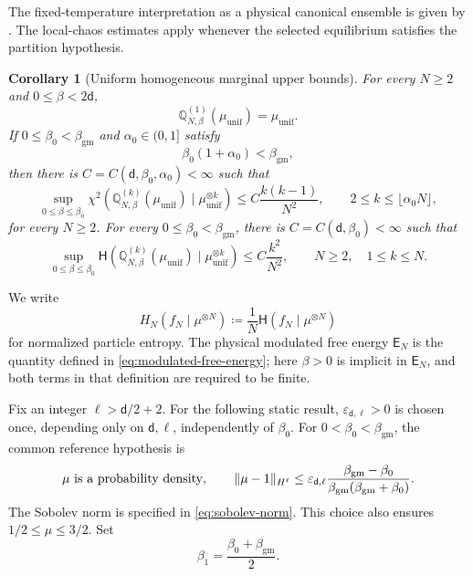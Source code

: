 \documentclass[11pt,reqno]{amsart}
\numberwithin{equation}{section}
\theoremstyle{plain}
\newtheorem{cor}[cor]{Corollary}
\theoremstyle{definition}
\DeclarePairedDelimiter{\norm}{\lVert}{\rVert}
\renewcommand{\d}{\mathsf d}
\newcommand{\Q}{\mathbb Q}
\newcommand{\be}{\beta}
\newcommand{\al}{\alpha}
\newcommand{\vep}{\varepsilon}
\newcommand{\Hr}{\mathsf H}
\newcommand{\Er}{\mathsf E}
\newcommand{\muunif}{\mu_{\mathrm{unif}}}
\newcommand{\gm}{\mathrm{gm}}
\begin{document}
The fixed-temperature interpretation as a physical canonical ensemble is given by . The local-chaos estimates apply whenever the selected equilibrium satisfies the partition hypothesis.

\begin{cor}[Uniform homogeneous marginal upper bounds]
\label{cor:homogeneous-local-chaos-upper-bounds}
For every $N\geq2$ and $0\leq\be<2\d$,
\begin{equation}
 \Q_{N,\be}^{(1)}(\muunif)=\muunif.
 \label{eq:homogeneous-exact-first-marginal}
\end{equation}
If $0\leq\be_0<\beta_{\gm}$ and $\al_0\in(0,1]$ satisfy
\begin{equation}
 \be_0(1+\al_0)<\beta_{\gm},
 \label{eq:homogeneous-local-window}
\end{equation}
then there is $C=C(\d,\be_0,\al_0)<\infty$ such that
\begin{equation}
 \sup_{0\leq\be\leq\be_0}
 \chi^2\!\left(\Q_{N,\be}^{(k)}(\muunif)\mid\muunif^{\otimes k}\right)
 \leq C\frac{k(k-1)}{N^2},
 \qquad 2\leq k\leq\lfloor\al_0N\rfloor,
 \label{eq:homogeneous-local-chi}
\end{equation}
for every $N\geq2$. For every $0\leq\be_0<\beta_{\gm}$, there is $C=C(\d,\be_0)<\infty$ such that
\begin{equation}
 \sup_{0\leq\be\leq\be_0}
 \Hr\!\left(\Q_{N,\be}^{(k)}(\muunif)\mid\muunif^{\otimes k}\right)
 \leq C\frac{k^2}{N^2},
 \qquad N\geq2,\quad 1\leq k\leq N.
 \label{eq:homogeneous-all-entropy}
\end{equation}
\end{cor}
We write
\begin{equation}
 H_N(f_N\mid\mu^{\otimes N})\coloneqq\frac1N\Hr(f_N\mid\mu^{\otimes N})
 \label{eq:normalized-particle-entropy}
\end{equation}
for normalized particle entropy. The physical modulated free energy $\Er_N$ is the quantity defined in \eqref{eq:modulated-free-energy}; here $\be>0$ is implicit in $\Er_N$, and both terms in that definition are required to be finite.

Fix an integer $\ell>\d/2+2$. For the following static result, $\vep_{\d,\ell}>0$ is chosen once, depending only on $\d,\ell$, independently of $\be_0$. For $0<\be_0<\beta_{\gm}$, the common reference hypothesis is
\begin{equation}
 \mu\text{ is a probability density},\qquad
 \norm{\mu-1}_{H^\ell}
 \leq\vep_{\d,\ell}
 \frac{\beta_{\gm}-\be_0}{\beta_{\gm}(\beta_{\gm}+\be_0)}.
 \label{eq:dyn-smallness}
\end{equation}
The Sobolev norm is specified in \eqref{eq:sobolev-norm}. This choice also ensures $1/2\leq\mu\leq3/2$. Set
\begin{equation}
 \be_1=\frac{\be_0+\beta_{\gm}}2.
 \label{eq:dyn-beta1}
\end{equation}
\end{document}
